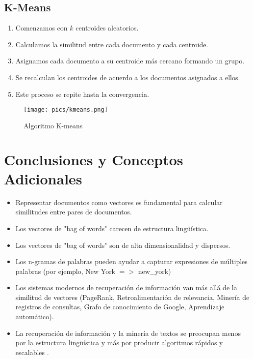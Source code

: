 \documentclass{book}
\begin{document}
\subsection{K-Means}
\begin{enumerate}
\item Comenzamos con $k$ centroides aleatorios.
\item Calculamos la similitud entre cada documento y cada centroide.
\item Asignamos cada documento a su centroide más cercano formando un grupo.
\item Se recalculan los centroides de acuerdo a los documentos asignados a ellos.
\item Este proceso se repite hasta la convergencia.
\end{enumerate}

\begin{figure}[h!]
\centering
\texttt{[image: pics/kmeans.png]}
\caption{ Algoritmo K-means}
\end{figure}

\section{Conclusiones y Conceptos Adicionales}
\begin{itemize}
\item Representar documentos como vectores es fundamental para calcular similitudes entre pares de documentos.
\item Los vectores de "bag of words" carecen de estructura lingüística.
\item Los vectores de "bag of words" son de alta dimensionalidad y dispersos.
\item Los n-gramas de palabras pueden ayudar a capturar expresiones de múltiples palabras (por ejemplo, New York $=>$ new\_york)
\item Los sistemas modernos de recuperación de información van más allá de la similitud de vectores (PageRank, Retroalimentación de relevancia, Minería de registros de consultas, Grafo de conocimiento de Google, Aprendizaje automático).
\item La recuperación de información y la minería de textos se preocupan menos por la estructura lingüística y más por producir algoritmos rápidos y escalables \cite{jacobbook}.
\end{itemize}





\end{document}
